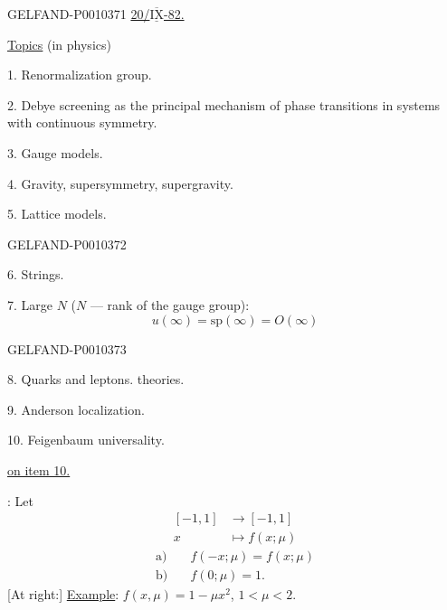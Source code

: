 \begin{GelfandAdjacentEvidence}{GELFAND-P001037}{1}
\underline{20/$\overline{\underline{\mathrm{IX}}}$-82.}\qquad {}


\underline{Topics} (in physics)

1. Renormalization group.

2. Debye screening as the principal mechanism of phase transitions in systems with continuous symmetry.

3. Gauge models.

4. Gravity, supersymmetry, supergravity.


5. Lattice models.
\end{GelfandAdjacentEvidence}
\begin{GelfandAdjacentEvidence}{GELFAND-P001037}{2}


6. Strings.

7. Large $N$ ($N$ --- rank of the gauge group):
\[
u(\infty)=\mathrm{sp}(\infty)=O(\infty)
\]
\end{GelfandAdjacentEvidence}
\begin{GelfandAdjacentEvidence}{GELFAND-P001037}{3}


8. Quarks and leptons.  theories.

9. Anderson localization.

10. Feigenbaum universality.
\end{GelfandAdjacentEvidence}


 \underline{on item 10.}

: Let
\[
\begin{aligned}
[-1,1]&\longrightarrow[-1,1]\\
x&\longmapsto f(x;\mu)
\end{aligned}
\]
\[
\begin{aligned}
\text{a)}\quad &f(-x;\mu)=f(x;\mu)\\
\text{b)}\quad &f(0;\mu)=1.
\end{aligned}
\]
[At right:] \underline{Example}: $f(x,\mu)=1-\mu x^2$, $1<\mu<2$.


